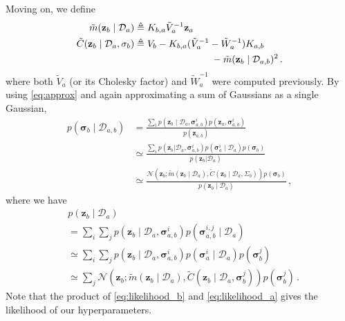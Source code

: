 \documentclass{article}
\newcommand{\given}{\ensuremath{\mid}}
\newcommand{\cm}[1]{\ensuremath{\mathcal{#1}}}
\newcommand{\bm}[1]{\ensuremath{\mathbf{#1}}}
\newcommand{\data}{\ensuremath{\cm{D}}}
\newcommand{\vect}[1]{\bm{#1}}
\newcommand{\vz}{\vect{z}}
\newcommand{\vs}{\vect{\sigma}}
\newcommand{\amean}[2]{\tilde{{m}}(#1 \given #2 )}
\newcommand{\acov}[2]{\tilde{{C}}(#1 \given #2 )}
\newcommand{\p}[2]{p(#1 \given #2 )}
\newcommand{\fPr}{p}
\newcommand{\Prob}[2]{\fPr(#1 \given #2 )}
\newcommand{\ps}[2]{p(#1\vert#2)}
\newcommand{\N}[3]{\cm{N}( #1;#2,#3 )}
\newcommand{\defequal}{\triangleq}
\begin{document}
 Moving on, we define
\begin{align}
\amean{\vz_b}{\data_a} & \defequal  
K_{b,a} \tilde{V}_a^{-1} \vz_a \label{eq;ameanba}
\\
\acov{\vz_b}{\data_{a},\vs_b}
& \defequal V_b - K_{b,a}(\tilde{V}_a^{-1}-\tilde{W}_a^{-1})K_{a,b} \nonumber\\
& \hspace{2.8cm} - \amean{\vz_b}{\data_{a,b}}^2 \,. \label{eq;acovba}
\end{align}
where both $\tilde{V}_a$ (or its Cholesky factor) and
$\tilde{W}_a^{-1}$ were computed previously. By using
\eqref{eq:approx} and again approximating a sum of Gaussians as a
single Gaussian,
\begin{align}
\Prob{\vs_b}{\data_{a,b}} & = \frac{\sum_i \p{\vz_b}{\data_a,\vs^i_{a,b}}p(\vz_a,\vs^i_{a,b})}{p(\vz_{a,b})}\nonumber\\
& \simeq \frac{\sum_i \ps{\vz_b}{\data_a,\vs^i_{a,b}}\fPr(\vs_a^i\mid{\data_a})\fPr(\vs_{b})}{\ps{\vz_{b}}{\data_a}}\nonumber\\
& \simeq \frac{\N{\vz_b}{\amean{\vz_b}{\data_a}}{\acov{\vz_b}{\data_a, \Sigma_b}} \fPr(\vs_b)}{\p{\vz_{b}}{\data_a}}\,,\label{eq:psb}
\end{align}
where we have
\begin{align}
&\p{\vz_{b}}{\data_a}\nonumber\\
& = \sum_i \sum_j \p{\vz_b}{\data_a,\vs^i_{a,b}}\Prob{\vs^{i,j}_{a,b}}{\data_a}\nonumber\\
& \simeq \sum_i \sum_j \p{\vz_b}{\data_a,\vs^i_{a,b}}\Prob{\vs_a^i}{\data_a}\fPr(\vs_{b}^j)\nonumber\\
& \simeq \sum_j \N{\vz_b}{\amean{\vz_b}{\data_a}}{\acov{\vz_b}{\data_a, \vs_b^j}} \fPr(\vs_b^j)\,.\label{eq:likelihood_b}
\end{align}
Note that the product of \eqref{eq:likelihood_b} and
\eqref{eq:likelihood_a} gives the likelihood of our hyperparameters.
\end{document}
